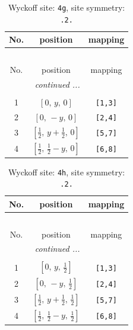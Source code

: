 \documentclass[fleqn,8pt]{jsarticle}
\begin{document}
\renewcommand{\arraystretch}{1.2}
\begin{longtable}{ccc}
\caption{Wyckoff site: {\tt 4g}, site symmetry: {\tt .2.}}
 \\
 \hline \hline
No. & position & mapping \\ \hline \endfirsthead

\multicolumn{2}{l}{\tablename\ \thetable{}} \\
 \hline \hline
No. & position & mapping \\ \hline \endhead

 \hline \hline
\multicolumn{2}{r}{\footnotesize\it continued ...} \\ \endfoot

 \hline \hline
\multicolumn{2}{r}{} \\ \endlastfoot

1 & $\left[ 0,\, y,\, 0 \right]$ & {\tt [1,3]} \\ \hline
2 & $\left[ 0,\, - y,\, 0 \right]$ & {\tt [2,4]} \\ \hline
3 & $\left[ \frac{1}{2},\, y + \frac{1}{2},\, 0 \right]$ & {\tt [5,7]} \\ \hline
4 & $\left[ \frac{1}{2},\, \frac{1}{2} - y,\, 0 \right]$ & {\tt [6,8]} \\
\end{longtable}
\renewcommand{\arraystretch}{1.2}
\begin{longtable}{ccc}
\caption{Wyckoff site: {\tt 4h}, site symmetry: {\tt .2.}}
 \\
 \hline \hline
No. & position & mapping \\ \hline \endfirsthead

\multicolumn{2}{l}{\tablename\ \thetable{}} \\
 \hline \hline
No. & position & mapping \\ \hline \endhead

 \hline \hline
\multicolumn{2}{r}{\footnotesize\it continued ...} \\ \endfoot

 \hline \hline
\multicolumn{2}{r}{} \\ \endlastfoot

1 & $\left[ 0,\, y,\, \frac{1}{2} \right]$ & {\tt [1,3]} \\ \hline
2 & $\left[ 0,\, - y,\, \frac{1}{2} \right]$ & {\tt [2,4]} \\ \hline
3 & $\left[ \frac{1}{2},\, y + \frac{1}{2},\, \frac{1}{2} \right]$ & {\tt [5,7]} \\ \hline
4 & $\left[ \frac{1}{2},\, \frac{1}{2} - y,\, \frac{1}{2} \right]$ & {\tt [6,8]} \\
\end{longtable}
\end{document}
